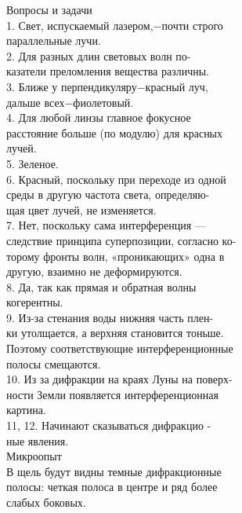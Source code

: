 \noindent Вопросы и задачи\\
1. Свет, испускаемый лазером,$-$почти строго\\ параллельные лучи.\\
2. Для разных длин световых волн по-\\ казатели преломления вещества различны.\\
3. Ближе у перпендикуляру$-$красный луч,\\ дальше всех$-$фиолетовый.\\
4. Для любой линзы главное фокусное\\ расстояние больше (по модулю) для красных\\ лучей.\\
5. Зеленое.\\
6. Красный, поскольку при переходе из одной\\ среды в другую частота света, определяю- \\ щая цвет лучей, не изменяется.\\
7. Нет, поскольку сама интерференция —\\ следствие принципа суперпозиции, согласно ко- \\ торому фронты волн, «проникающих» одна в\\ другую, взаимно не деформируются.\\
8. Да, так как прямая и обратная волны\\ когерентны.\\
9. Из-за стенания воды нижняя часть плен-\\ ки утолщается, а верхняя становится тоньше.\\ Поэтому соответствующие интерференционные\\ полосы смещаются.\\
10. Из за дифракции на краях Луны на поверх-\\ ности Земли появляется интерференционная\\ картина.\\
11, 12. Начинают сказываться дифракцио -\\ ные явления.\\

\noindent Микроопыт\\
В щель будут видны темные дифракционные\\ полосы: четкая полоса в центре и ряд более\\ слабых боковых.\\ \\ \\ 

